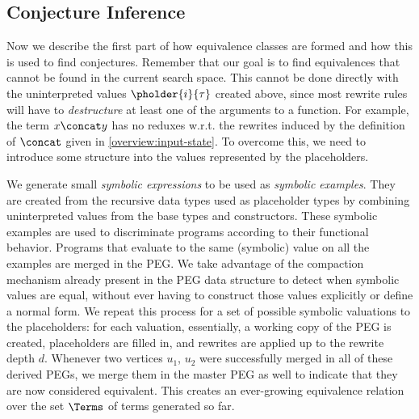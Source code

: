 \subsection{Conjecture Inference}
\label{screening:soe}


Now we describe the first part of how equivalence classes are formed and how this is used to find conjectures. Remember that our goal is to find equivalences that cannot be found in the current search space.
This cannot be done directly with the uninterpreted values $\pholder{i}{\tau}$ created above,
since most rewrite rules will have to \emph{destructure} at least one of the arguments to a function.
For example, the term $x \concat y$ has no reduxes w.r.t. the rewrites induced by the definition
of $\concat$ given in \autoref{overview:input-state}.
To overcome this, we need to introduce some structure into the values represented by the placeholders.

We generate small \emph{symbolic expressions} to be used as \emph{symbolic examples}.
They are created from the recursive data types used as placeholder types
by combining uninterpreted values from the base types and constructors.
These symbolic examples are used to discriminate programs according to their functional behavior. 
Programs that evaluate to the same (symbolic) value on all the examples are merged in the PEG. 
We take advantage of the compaction mechanism already present in the PEG data structure to detect when
symbolic values are equal, without ever having to construct those values explicitly or define a normal form.
We repeat this process for a set of possible symbolic valuations to the placeholders: for each valuation,
essentially, a working copy of the PEG is created, placeholders are filled in, and rewrites are applied up to the rewrite depth $d$.
Whenever two vertices $u_1$, $u_2$ were successfully merged in all of these derived PEGs, we merge them
in the master PEG as well to indicate that they are now considered equivalent.
This creates an ever-growing equivalence relation over the set $\Terms$ of terms generated so far.

\begin{comment}
\SI{This should go somewhere else probably}
{\color{gray}
Before explaining how the examples are generated and used, we define Rewrite Search. Rewrite Search is how we explore the term search space, by iteratively applying the known rewrite rules. After applying all the rewrite rules in iteration $i$, all proofs of depth $i$ will have been found. This means all term equalities provable with $i$ steps will be expressed as merges in the compact structure. There is no point of matching rewrite rules on the same parts of the graph twice. To prevent this we use a versioned graph and for each iteration match at least one part of the rewrite rule with the newest version of the graph.
}
\end{comment}

